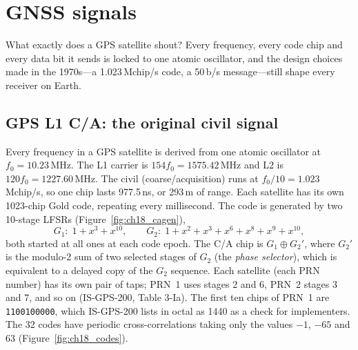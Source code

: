 \section{GNSS signals}
\label{sec:ch18:signals}

What exactly does a GPS satellite shout? Every frequency, every code chip and every data bit
it sends is locked to one atomic oscillator, and the design choices made in the 1970s---a
1.023\,Mchip/s code, a 50\,b/s message---still shape every receiver on Earth.

\subsection{GPS L1 C/A: the original civil signal}
\label{sec:ch18:gpsca}

Every frequency in a GPS satellite is derived from one atomic oscillator at
$f_0=10.23$\,MHz. The L1 carrier is $154f_0=1575.42$\,MHz and L2 is $120f_0=1227.60$\,MHz. The
civil  (coarse/acquisition) runs at $f_0/10=1.023$\,Mchip/s, so one chip lasts
977.5\,ns, or 293\,m of range. Each satellite has its own 1023-chip Gold code, repeating every
millisecond. The code is generated by two 10-stage LFSRs (Figure~\ref{fig:ch18_cagen}),
\begin{equation}
G_1:\;1+x^3+x^{10},\qquad G_2:\;1+x^2+x^3+x^6+x^8+x^9+x^{10},
\end{equation}
both started at all ones at each code epoch. The C/A chip is $G_1\oplus G_2'$, where $G_2'$ is
the modulo-2 sum of two selected stages of $G_2$ (the \emph{phase selector}), which is
equivalent to a delayed copy of the $G_2$ sequence. Each satellite (each PRN number) has its
own pair of taps; PRN~1 uses stages 2 and 6, PRN~2 stages 3 and 7, and so on (IS-GPS-200, Table
3-Ia). The first ten chips of PRN~1 are \texttt{1100100000}, which IS-GPS-200 lists in octal as
1440 as a check for implementers. The 32 codes have periodic cross-correlations taking only
the values $-1$, $-65$ and $63$ (Figure~\ref{fig:ch18_codes}).

